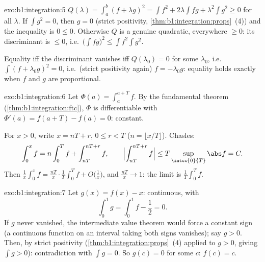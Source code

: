 \begin{solution}{exo:b1:integration:5}
$Q(\lambda) = \int_a^b (f + \lambda g)^2 = \int f^2 + 2\lambda \int
fg + \lambda^2 \int g^2 \geq 0$ for all $\lambda$. If $\int g^2 =
0$, then $g = 0$ (strict positivity,
\cref{thm:b1:integration:props}~(4)) and the inequality is $0 \leq
0$. Otherwise $Q$ is a genuine quadratic, everywhere $\geq 0$: its
discriminant is $\leq 0$, i.e.\ $\bigl(\int fg\bigr)^2 \leq \int
f^2 \int g^2$.

Equality iff the discriminant vanishes iff $Q(\lambda_0) = 0$ for
some $\lambda_0$, i.e.\ $\int (f + \lambda_0 g)^2 = 0$, i.e.\ (strict
positivity again) $f = -\lambda_0 g$: equality holds exactly when
$f$ and $g$ are proportional.
\end{solution}

\begin{solution}{exo:b1:integration:6}
Let $\Phi(a) = \int_a^{a+T} f$. By the fundamental theorem
(\cref{thm:b1:integration:ftc}), $\Phi$ is differentiable with
$\Phi'(a) = f(a + T) - f(a) = 0$: constant.

For $x > 0$, write $x = nT + r$, $0 \leq r < T$ ($n = \lfloor x/T
\rfloor$). Chasles:
\[
\int_0^x f = n \int_0^T f + \int_{nT}^{nT + r} f,
\qquad
\Bigl| \int_{nT}^{nT+r} f \Bigr| \leq T \sup_{\intcc{0}{T}} \abs f
= C .
\]
Then $\frac 1x \int_0^x f = \frac{nT}{x}\cdot\frac 1T \int_0^T f +
O\bigl(\frac 1x\bigr)$, and $\frac{nT}{x} \to 1$: the limit is
$\frac1T \int_0^T f$.
\end{solution}

\begin{solution}{exo:b1:integration:7}
Let $g(x) = f(x) - x$: continuous, with
\[
\int_0^1 g = \int_0^1 f - \frac12 = 0 .
\]
If $g$ never vanished, the intermediate value theorem would force a
constant sign (a continuous function on an interval taking both signs
vanishes); say $g > 0$. Then, by strict positivity
(\cref{thm:b1:integration:props}~(4) applied to $g > 0$, giving
$\int g > 0$): contradiction with $\int g = 0$. So $g(c) = 0$ for
some $c$: $f(c) = c$.
\end{solution}

